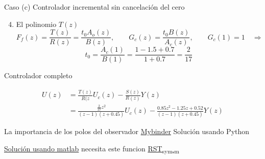 \documentclass[presentation,aspectratio=169]{beamer}
\begin{document}
\begin{frame}[label={sec:orged72f11}]{Caso (c) Controlador incremental sin cancelación del cero}
\begin{enumerate}
\setcounter{enumi}{3}
\item \alert{El polinomio \(T(z)\)}  \[F_f(z) = \frac{T(z)}{R(z)} = \frac{t_0 A_o(z)}{B(z)}, \qquad G_c(z) = \frac{t_0 B(z)}{A_c(z)}, \qquad G_c(1) = 1 \quad\Rightarrow \]
\alert{\[ t_0 = \frac{A_c(1)}{B(1)} = \frac{1 - 1.5 + 0.7}{1+0.7} = \frac{2}{17}\]}
\end{enumerate}

Controlador completo

\begin{align*}
U(z) &= \frac{T(z)}{R(z}U_c(z) - \frac{S(z)}{R(z)}Y(z) \\
     &= \frac{\frac{2}{17}z^2}{(z-1)(z+0.45)}U_c(z) - \frac{0.85z^2 - 1.25z + 0.52}{(z-1)(z+0.45)} Y(z)
     \end{align*}
\end{frame}

\begin{frame}[label={sec:orga83fd9e}]{La importancia de los polos del observador}
\href{https://mybinder.org/v2/gh/kjartan-at-tec/mr2007-computerized-control/master?filepath=.\%Fpolynomial-design\%Fnotebooks\%FA-and-W-5.3.ipynb}{Mybinder} Solución usando Python

\href{https://github.com/kjartan-at-tec/mr2007-computerized-control/blob/master/polynomial-design/matlab/AW\_5\_3.m}{Solución usando matlab} necesita este funcion \href{https://github.com/kjartan-at-tec/mr2007-computerized-control/blob/master/polynomial-design/matlab/RST\_sym.m}{RST\textsubscript{sym.m}}
\end{frame}
\end{document}

